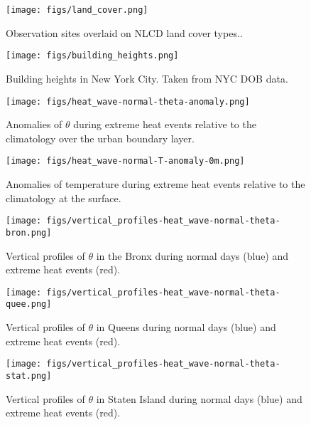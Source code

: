 \documentclass[11pt,a4paper]{article}
\begin{document}
\begin{figure}[ht]
	\centering
	\texttt{[image: figs/land\_cover.png]}
	\caption{Observation sites overlaid on NLCD land cover types..}
	\label{fig:land_cover}
\end{figure}
 
\begin{figure}[ht]
	\centering
	\texttt{[image: figs/building\_heights.png]}
	\caption{Building heights in New York City. Taken from NYC DOB data.}
	\label{fig:building_heights}
\end{figure}


\begin{figure}[ht]
	\centering
	\texttt{[image: figs/heat\_wave-normal-theta-anomaly.png]}
	\caption{Anomalies of $\theta$ during extreme heat events relative to the climatology over the urban boundary layer.}
	\label{fig:extreme-heat-normal-comparison-contours-theta}
\end{figure}
\begin{figure}[ht]
	\centering
	\texttt{[image: figs/heat\_wave-normal-T-anomaly-0m.png]}
	\caption{Anomalies of temperature during extreme heat events relative to the climatology at the surface.}
	\label{fig:extreme_heat_normal_0m_comparison_T}
\end{figure}
\begin{figure}[ht]
	\centering
	\texttt{[image: figs/vertical\_profiles-heat\_wave-normal-theta-bron.png]}
	\caption{Vertical profiles of $\theta$ in the Bronx during normal days (blue) and extreme heat events (red).}
	\label{fig:vertical_profiles-heat_wave-normal-theta-bron}
\end{figure}
\begin{figure}[ht]
	\centering
	\texttt{[image: figs/vertical\_profiles-heat\_wave-normal-theta-quee.png]}
	\caption{Vertical profiles of $\theta$ in Queens during normal days (blue) and extreme heat events (red).}
	\label{fig:vertical_profiles-heat_wave-normal-theta-quee}
\end{figure}
\begin{figure}[ht]
	\centering
	\texttt{[image: figs/vertical\_profiles-heat\_wave-normal-theta-stat.png]}
	\caption{Vertical profiles of $\theta$ in Staten Island during normal days (blue) and extreme heat events (red).}
	\label{fig:vertical_profiles-heat_wave-normal-theta-stat}
\end{figure}
\end{document}
